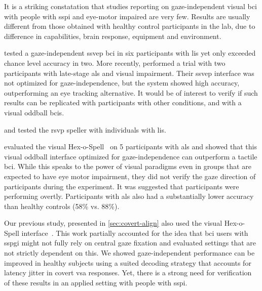 It is a striking constatation that studies reporting on
gaze-independent visual \ac{bci} with people with \ac{sspi} and eye-motor
impaired are very few.
Results are usually different from those obtained with healthy control
participants in the lab, due to difference in capabilities, brain
response, equipment and environment.

\textcite{Lesenfants2014} tested a gaze-independent \ac{ssvep} \ac{bci} in six
participants with \ac{lis} yet only exceeded chance level accuracy in two.
More recently, \textcite{Peters2020} performed a trial with two
participants with late-stage \ac{als} and visual impairment.
Their \ac{ssvep} interface was not optimized for gaze-independence, but the
system showed high accuracy, outperforming an eye tracking alternative.
It would be of interest to verify if such results can be replicated with
participants with other conditions, and with a visual oddball \acp{bci}.

\textcite{Orhan2012} and \textcite{Oken2014} tested the \ac{rsvp} speller with
individuals with \ac{lis}.

\textcite{Severens2014} evaluated the visual Hex-o-Spell~\cite{Treder2010} on 5
participants with \ac{als} and showed that this visual oddball interface optimized
for gaze-independence can outperform a tactile \ac{bci}.
While this speaks to the power of visual paradigms even in groups that are
expected to have eye motor impairment, they did not verify the gaze direction
of participants during the experiment.
It was suggested that participants were performing overtly.
Participants with \ac{als} also had a substantially lower accuracy than healthy
controls (58\% vs. 88\%).

Our previous study, presented in \cref{sec:covert-align} also used the
visual Hex-o-Spell interface~\cite{VanDenKerchove2024}.
This work partially accounted for the idea that \ac{bci} users with \ac{sspgi} might
not fully rely on central gaze fixation and evaluated settings that are not
strictly dependent on this.
We showed gaze-independent performance can be improved in healthy subjects
using a suited decoding strategy that accounts for latency jitter in covert \ac{vsa} responses.
Yet, there is a strong need for verification of these results in an applied
setting with people with \ac{sspi}.

